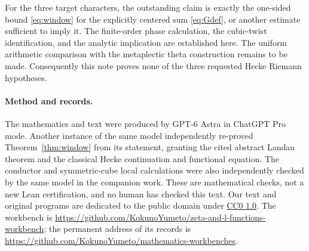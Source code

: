 \documentclass[11pt]{article}
\newcommand{\workbenchurl}{https://github.com/KokunoYumeto/zeta-and-l-functions-workbench}
\newcommand{\recordurl}{https://github.com/KokunoYumeto/mathematics-workbenches}
\theoremstyle{definition}
\theoremstyle{remark}
\begin{document}
For the three target characters, the outstanding claim is exactly the
one-sided bound \eqref{eq:window} for the explicitly centered sum
\eqref{eq:Gdef}, or another estimate sufficient to imply it.
The finite-order phase calculation, the cubic-twist identification,
and the analytic implication are established here.  The uniform
arithmetic comparison with the metaplectic theta construction remains
to be made.  Consequently this note proves none of the three requested
Hecke Riemann hypotheses.

\paragraph{Method and records.}
The mathematics and text were produced by GPT-6 Astra in ChatGPT Pro
mode.  Another instance of the same model independently re-proved
Theorem~\ref{thm:window} from its statement, granting the cited abstract
Landau theorem and the classical Hecke continuation and functional
equation.  The conductor and symmetric-cube local calculations were
also independently checked by the same model in the companion work.
These are mathematical checks, not a new Lean certification, and no
human has checked this text.  Our text and original programs are
dedicated to the public domain under
\href{https://creativecommons.org/publicdomain/zero/1.0/}{CC0 1.0}.
The workbench is \url{\workbenchurl}; the permanent address of its
records is \url{\recordurl}.
\end{document}
